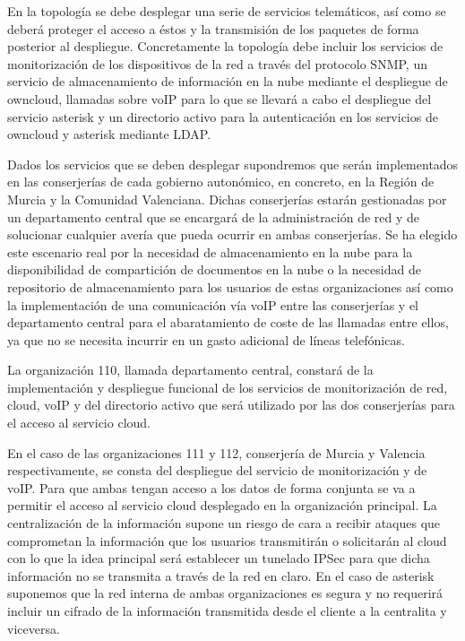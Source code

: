 \documentclass[a4paper]{article}
\begin{document}
En la topología se debe desplegar una serie de servicios telemáticos, así como se deberá proteger el acceso a éstos y la transmisión de los paquetes de forma posterior al despliegue.  Concretamente la topología debe incluir los servicios de monitorización de los dispositivos de la red a través del protocolo SNMP, un servicio de almacenamiento de información en la nube mediante el despliegue de owncloud, llamadas sobre voIP para
lo que se llevará a cabo el despliegue del servicio asterisk y un directorio activo para la autenticación en los servicios de owncloud y asterisk mediante LDAP.

 Dados los servicios que se deben desplegar supondremos que serán implementados en las conserjerías de cada gobierno autonómico, en concreto, en la Región de Murcia y la Comunidad Valenciana. Dichas conserjerías estarán gestionadas por un departamento central que se encargará de la administración de red y de solucionar cualquier avería que pueda ocurrir en ambas conserjerías. Se ha elegido este escenario real por la necesidad de almacenamiento en la nube para la disponibilidad de compartición de documentos en la nube o la necesidad de repositorio de almacenamiento para los usuarios de estas organizaciones así como la implementación de una comunicación vía voIP entre las conserjerías y el departamento central para el abaratamiento de coste de las llamadas entre ellos, ya que no se necesita
incurrir en un gasto adicional de líneas telefónicas.


 La organización 110, llamada departamento central, constará de la implementación y despliegue funcional de los servicios de monitorización de red, cloud, voIP y del directorio activo que será utilizado por las dos conserjerías para el acceso al servicio cloud.


 En el caso de las organizaciones 111 y 112, conserjería de Murcia y Valencia respectivamente, se consta del despliegue del servicio de monitorización y de voIP. Para que ambas tengan acceso a los datos de forma conjunta se va a permitir el acceso al servicio cloud desplegado en la organización principal. La centralización de la información supone un riesgo de cara a recibir ataques que comprometan la información que los usuarios transmitirán o solicitarán al cloud con lo que la idea principal será establecer un tunelado IPSec para que dicha información no
se transmita a través de la red en claro. En el caso de asterisk suponemos que la red interna de ambas organizaciones es segura y no requerirá incluir un cifrado de la información transmitida desde el cliente a la centralita y viceversa.
\end{document}
